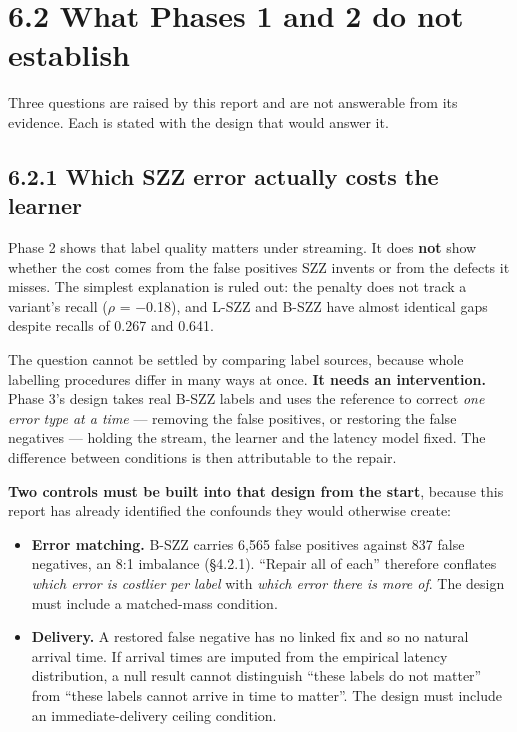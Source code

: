 \section{6.2 What Phases 1 and 2 do not
establish}\label{what-phases-1-and-2-do-not-establish}

Three questions are raised by this report and are not answerable from
its evidence. Each is stated with the design that would answer it.

\subsection{6.2.1 Which SZZ error actually costs the
learner}\label{which-szz-error-actually-costs-the-learner}

Phase 2 shows that label quality matters under streaming. It does
\textbf{not} show whether the cost comes from the false positives SZZ
invents or from the defects it misses. The simplest explanation is ruled
out: the penalty does not track a variant's recall (\ensuremath{\rho} = \ensuremath{-}0.18), and
L-SZZ and B-SZZ have almost identical gaps despite recalls of 0.267 and
0.641.

The question cannot be settled by comparing label sources, because whole
labelling procedures differ in many ways at once. \textbf{It needs an
intervention.} Phase 3's design takes real B-SZZ labels and uses the
reference to correct \emph{one error type at a time} --- removing the
false positives, or restoring the false negatives --- holding the
stream, the learner and the latency model fixed. The difference between
conditions is then attributable to the repair.

\textbf{Two controls must be built into that design from the start},
because this report has already identified the confounds they would
otherwise create:

\begin{itemize}
\tightlist
\item
  \textbf{Error matching.} B-SZZ carries 6,565 false positives against
  837 false negatives, an 8:1 imbalance (\S{}4.2.1). ``Repair all of each''
  therefore conflates \emph{which error is costlier per label} with
  \emph{which error there is more of}. The design must include a
  matched-mass condition.
\item
  \textbf{Delivery.} A restored false negative has no linked fix and so
  no natural arrival time. If arrival times are imputed from the
  empirical latency distribution, a null result cannot distinguish
  ``these labels do not matter'' from ``these labels cannot arrive in
  time to matter''. The design must include an immediate-delivery
  ceiling condition.
\end{itemize}

